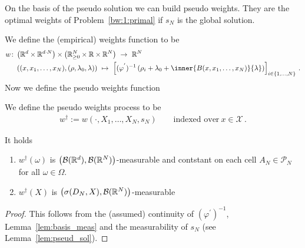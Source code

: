 On the basis of the pseudo solution we can build pseudo weights.
They are the optimal weights of Problem~\ref{bw:1:primal} if $s_N$ is the global solution. 

We define the (empirical) weights function to be
\begin{align*}
  w\colon
  &
  \left(
  \R^d\times \R^{d\cdot N}
  \right)
  \times
  \left(
  \R^N_{\ge 0}
  \times
  \R
  \times
  \R^{N}
  \right)
  \ 
  \to
  \ 
  \R^N
  \\
  &
  \left(
  (x,x_1,\ldots,x_N),(\rho,\lambda_0,\lambda)
  \right)
  \ 
  \mapsto
  \ 
  \left[
  (\varphi^{'})^{-1}
  \left(
    \rho_i
    +
    \lambda_0
    +
    \inner
    {B(x,x_1,\ldots,x_N)}{\lambda}
  \right)
\right]_{i\in \left\{
  1,\ldots,N
\right\}}
\,.
\end{align*}
Now we define the pseudo weights function
\begin{definition}
  We define the pseudo weights process to be
  \begin{align*}
    w^\dagger
    :=
    w(\cdot,X_1,\ldots,X_N,s_N)
    \qquad
    \text{indexed over}\ 
    x\in\mathcal{X}
    \,.
  \end{align*}
\end{definition}
\begin{lemma}
 It holds
 \begin{enumerate}[label=(\roman*)]
   \item
$w^\dagger(\omega)$ is 
$
\left(
\mathcal{B}(\mathbb{R}^d),\mathcal{B}(\mathbb{R}^N)
\right)
$-measurable 
and contstant on each cell $A_N\in\mathcal{P}_N$ for all $\omega\in\Omega$. 
\item
$w^\dagger(X)$ is 
$
\left(
  \sigma(D_N,X),\mathcal{B}(\mathbb{R}^N)
\right)
$-measurable 
 \end{enumerate}
\end{lemma}
\begin{proof}
  This follows from the (assumed) continuity of 
  $
  (
  \varphi^{'}
  )^{-1}
  $,
  Lemma~\ref{lem:basis_meas} and the measurability of $s_N$ (see Lemma~\ref{lem:pseud_sol}).
\end{proof}


